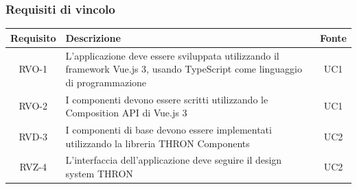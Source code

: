 \subsubsection{Requisiti di vincolo}


\begin{center}
\label{tab:requisiti-vincolo}
\begin{longtable}{|c|p{}|c|}
\hline
\textbf{Requisito} & \textbf{Descrizione} & \textbf{Fonte}\\
\hline
RVO-1 & L'applicazione deve essere sviluppata utilizzando il framework Vue.js 3, usando TypeScript come linguaggio di programmazione & UC1 \\
\hline
RVO-2 & I componenti devono essere scritti utilizzando le Composition API di Vue.js 3 & UC1 \\
\hline
RVD-3 & I componenti di base devono essere implementati utilizzando la libreria THRON Components & UC2 \\
\hline
RVZ-4 & L'interfaccia dell'applicazione deve seguire il design system THRON & UC2 \\
\hline
\end{longtable}
\end{center}